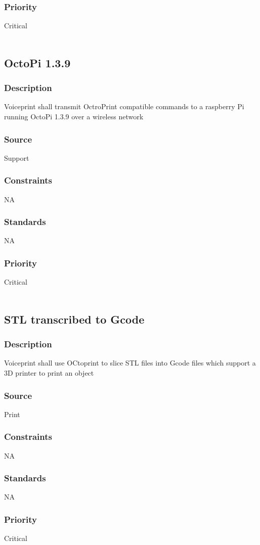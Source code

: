 \subsubsection{Priority}
Critical \\
\\
\subsection{OctoPi 1.3.9}
\subsubsection{Description}
Voiceprint shall transmit OctroPrint compatible commands to a raspberry Pi running OctoPi 1.3.9 over a wireless network
\subsubsection{Source}
Support
\subsubsection{Constraints}
NA
\subsubsection{Standards}
NA
\subsubsection{Priority}
Critical \\
\\
\subsection{STL transcribed to Gcode}
\subsubsection{Description}
Voiceprint shall use OCtoprint to slice STL files into Gcode files which support a 3D printer to print an object
\subsubsection{Source}
Print
\subsubsection{Constraints}
NA
\subsubsection{Standards}
NA
\subsubsection{Priority}
Critical \\
\\


































